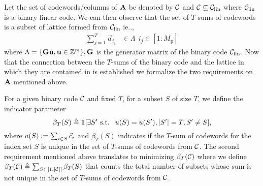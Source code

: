 Let the set of codewords/columns of $\mathbf{A}$ be denoted by $\mathcal{C}$ and $\mathcal{C}\subseteq \mathcal{C}_{\text{lin}}$ where $\mathcal{C}_{\text{lin}}$ is a binary linear code. We can then observe that the set of $T$-sums of codewords is a subset of lattice formed from $\mathcal{C}_{\text{lin}}$ ie..,
\begin{align*}
\sum_{j=1}^{T}\vec{a}_{i_j}&\in \Lambda ~~ i_j\in[1:M_\mathrm{p}]
\end{align*}
where $\Lambda =\{\mathbf{G}\mathbf{u},\mathbf{u}\in \mathbb{Z}^{m}\}, \mathbf{G}$ is the generator matrix of the binary code $\mathcal{C}_{\text{lin}}$. Now that the connection between the $T$-sums of the binary code and the lattice in which they are contained in is established we formalize the two requirements on $\mathbf{A}$ mentioned above.


\begin{definition}
For a given binary code $\mathcal{C}$ and fixed $T$, for a subset $S$ of size $T$, we define the indicator parameter
\[
\beta_T(S) \triangleq \mathbf{1}[\exists S' \text{ s.t. }~ u(S)= u(S'), |S'|=T,S'\neq S],
\]
where $u(S)\mathrel{\mathop:}= \sum_{i\in S}\vec{c}_i$ and $\beta_T(S)$ indicates if the $T$-sum of codewords for the index set $S$ is unique in the set of $T$-sums of codewords from $\mathcal{C}$. The second requirement mentioned above translates to minimizing $\beta_T(\mathcal{C})$ where we define $\beta_T(\mathcal{C})\triangleq \sum_{S\subset [1:|\mathcal{C}|]}\beta_T(S)$ that counts the total number of subsets whose sum is not unique in the set of $T$-sums of codewords from $\mathcal{C}$.
\label{Def:disjunctive_parameter_Tsum}
\end{definition}

